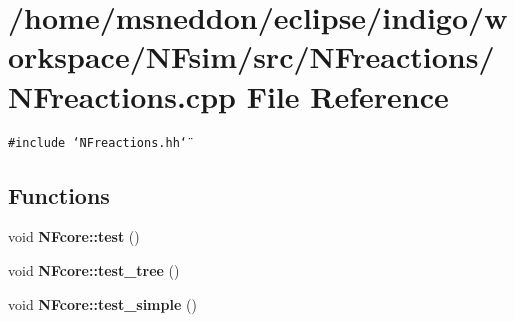 \section{/home/msneddon/eclipse/indigo/workspace/NFsim/src/NFreactions/NFreactions.cpp File Reference}
\label{NFreactions_8cpp}


{\tt \#include \char`\"{}NFreactions.hh\char`\"{}}\par
\subsection*{Functions}
\begin{CompactItemize}
\item 
void {\bf NFcore::test} ()
\item 
void {\bf NFcore::test\_\-tree} ()
\item 
void {\bf NFcore::test\_\-simple} ()
\end{CompactItemize}
